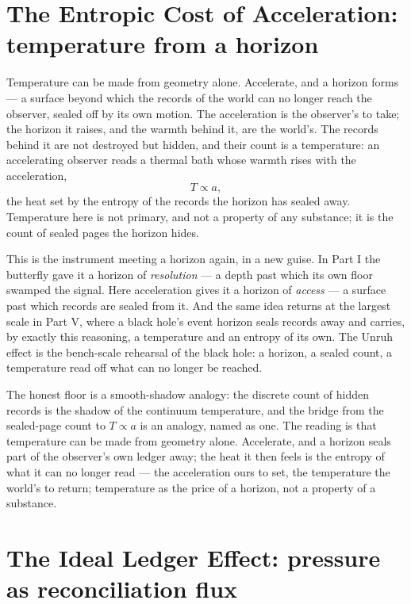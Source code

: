 \section{The Entropic Cost of Acceleration: temperature from a horizon}
\label{se:unruh}

Temperature can be made from geometry alone. Accelerate, and a horizon
forms --- a surface beyond which the records of the world can no longer reach the observer, sealed off by its
own motion. The acceleration is the observer's to take; the horizon it raises, and the warmth behind it, are
the world's. The records behind it are not destroyed but hidden, and their count is a temperature: an
accelerating observer reads a thermal bath whose warmth rises with the acceleration,
\begin{equation}
  T \propto a,
\end{equation}
the heat set by the entropy of the records the horizon has sealed away. Temperature here is not primary, and
not a property of any substance; it is the count of sealed pages the horizon hides.

This is the instrument meeting a horizon again, in a new guise. In Part I the butterfly gave it a horizon of
\emph{resolution} --- a depth past which its own floor swamped the signal. Here acceleration gives it a
horizon of \emph{access} --- a surface past which records are sealed from it. And the same idea returns at the
largest scale in Part V, where a black hole's event horizon seals records away and carries, by exactly this
reasoning, a temperature and an entropy of its own. The Unruh effect is the bench-scale rehearsal of the
black hole: a horizon, a sealed count, a temperature read off what can no longer be reached.

The honest floor is a smooth-shadow analogy: the discrete count of hidden records is the shadow of the
continuum temperature, and the bridge from the sealed-page count to $T \propto a$ is an analogy, named as one.
The reading is that temperature can be made from geometry alone. Accelerate, and a horizon seals part of the
observer's own ledger away; the heat it then feels is the entropy of what it can no longer read --- the
acceleration ours to set, the temperature the world's to return; temperature as the price of a horizon, not a
property of a substance.

\section{The Ideal Ledger Effect: pressure as reconciliation flux}
\label{se:ideal-ledger}

